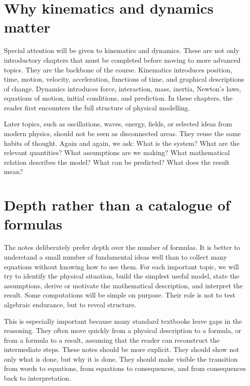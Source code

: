 \section{Why kinematics and dynamics matter}

Special attention will be given to kinematics and dynamics. These are not only introductory chapters that must be completed before moving to more advanced topics. They are the backbone of the course. Kinematics introduces position, time, motion, velocity, acceleration, functions of time, and graphical descriptions of change. Dynamics introduces force, interaction, mass, inertia, Newton's laws, equations of motion, initial conditions, and prediction. In these chapters, the reader first encounters the full structure of physical modelling.

Later topics, such as oscillations, waves, energy, fields, or selected ideas from modern physics, should not be seen as disconnected areas. They reuse the same habits of thought. Again and again, we ask: What is the system? What are the relevant quantities? What assumptions are we making? What mathematical relation describes the model? What can be predicted? What does the result mean?

\section{Depth rather than a catalogue of formulas}

The notes deliberately prefer depth over the number of formulas. It is better to understand a small number of fundamental ideas well than to collect many equations without knowing how to use them. For each important topic, we will try to identify the physical situation, build the simplest useful model, state the assumptions, derive or motivate the mathematical description, and interpret the result. Some computations will be simple on purpose. Their role is not to test algebraic endurance, but to reveal structure.

This is especially important because many standard textbooks leave gaps in the reasoning. They often move quickly from a physical description to a formula, or from a formula to a result, assuming that the reader can reconstruct the intermediate steps. These notes should be more explicit. They should show not only what is done, but why it is done. They should make visible the transition from words to equations, from equations to consequences, and from consequences back to interpretation.

